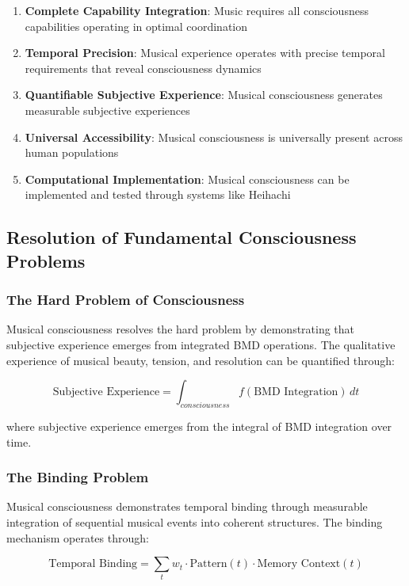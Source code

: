 \documentclass[12pt,a4paper]{article}
\begin{document}
\begin{enumerate}
\item \textbf{Complete Capability Integration}: Music requires all consciousness capabilities operating in optimal coordination
\item \textbf{Temporal Precision}: Musical experience operates with precise temporal requirements that reveal consciousness dynamics
\item \textbf{Quantifiable Subjective Experience}: Musical consciousness generates measurable subjective experiences
\item \textbf{Universal Accessibility}: Musical consciousness is universally present across human populations
\item \textbf{Computational Implementation}: Musical consciousness can be implemented and tested through systems like Heihachi
\end{enumerate}

\subsection{Resolution of Fundamental Consciousness Problems}

\subsubsection{The Hard Problem of Consciousness}

Musical consciousness resolves the hard problem by demonstrating that subjective experience emerges from integrated BMD operations. The qualitative experience of musical beauty, tension, and resolution can be quantified through:

$$\text{Subjective Experience} = \int_{consciousness} f(\text{BMD Integration}) \, dt$$

where subjective experience emerges from the integral of BMD integration over time.

\subsubsection{The Binding Problem}

Musical consciousness demonstrates temporal binding through measurable integration of sequential musical events into coherent structures. The binding mechanism operates through:

$$\text{Temporal Binding} = \sum_{t} w_t \cdot \text{Pattern}(t) \cdot \text{Memory Context}(t)$$
\end{document}
